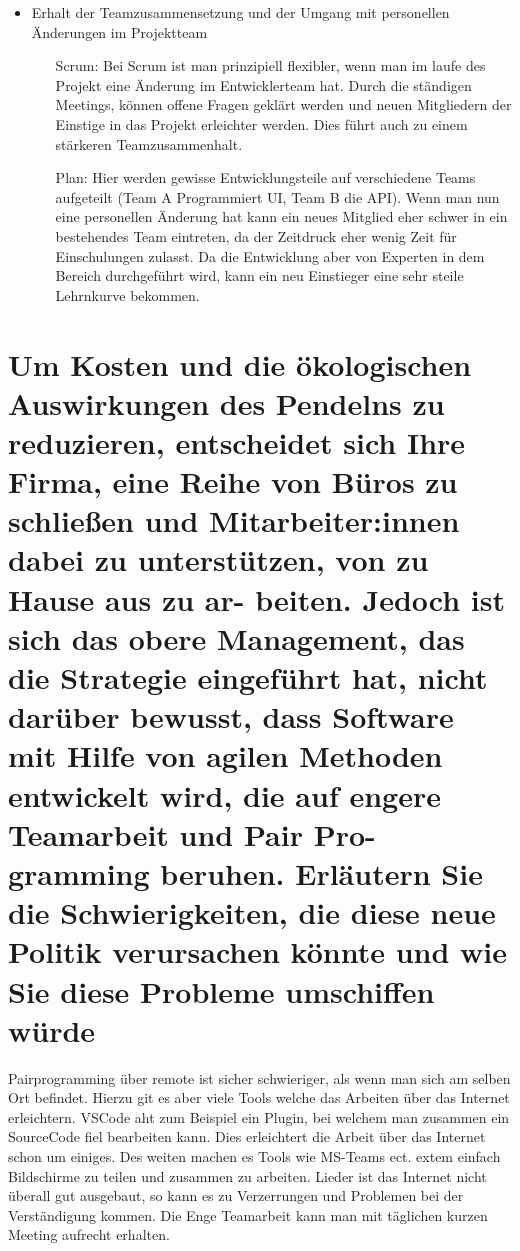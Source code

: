 \documentclass[12pt]{article}
\begin{document}
\begin{itemize}
\begin{itemize}
 \end{itemize}
 \item Erhalt der Teamzusammensetzung und der Umgang mit personellen Änderungen im Projektteam
 \begin{itemize}
  \item [Scrum:] Bei Scrum ist man prinzipiell flexibler, wenn man im laufe des Projekt eine Änderung im Entwicklerteam hat. Durch die ständigen Meetings, können offene Fragen geklärt werden und neuen Mitgliedern der Einstige in das Projekt erleichter werden. Dies führt auch zu einem stärkeren Teamzusammenhalt.
  \item[Plan:] Hier werden gewisse Entwicklungsteile auf verschiedene Teams aufgeteilt (Team A Programmiert UI, Team B die API). Wenn man nun eine personellen Änderung hat kann ein neues Mitglied eher schwer in ein bestehendes Team eintreten, da der Zeitdruck eher wenig Zeit für Einschulungen zulasst. Da die Entwicklung aber von Experten in dem Bereich durchgeführt wird, kann ein neu Einstieger eine sehr steile Lehrnkurve bekommen.
 \end{itemize}
\end{itemize}

\section{Um Kosten und die ökologischen Auswirkungen des Pendelns zu reduzieren, entscheidet sich Ihre Firma,
eine Reihe von Büros zu schließen und Mitarbeiter:innen dabei zu unterstützen, von zu Hause aus zu ar-
beiten. Jedoch ist sich das obere Management, das die Strategie eingeführt hat, nicht darüber bewusst,
dass Software mit Hilfe von agilen Methoden entwickelt wird, die auf engere Teamarbeit und Pair Pro-
gramming beruhen. Erläutern Sie die Schwierigkeiten, die diese neue Politik verursachen könnte und wie
Sie diese Probleme umschiffen würde}
Pairprogramming über remote ist sicher schwieriger, als wenn man sich am selben Ort befindet. Hierzu git es aber viele Tools welche das Arbeiten über das Internet erleichtern. VSCode aht zum Beispiel ein Plugin, bei welchem man zusammen ein SourceCode fiel bearbeiten kann. Dies erleichtert die Arbeit über das Internet schon um einiges. Des weiten machen es Tools wie MS-Teams ect. extem einfach Bildschirme zu teilen und zusammen zu arbeiten. Lieder ist das Internet nicht überall gut ausgebaut, so kann es zu Verzerrungen und Problemen bei der Verständigung kommen. Die Enge Teamarbeit kann man mit täglichen kurzen Meeting aufrecht erhalten.
\end{document}
